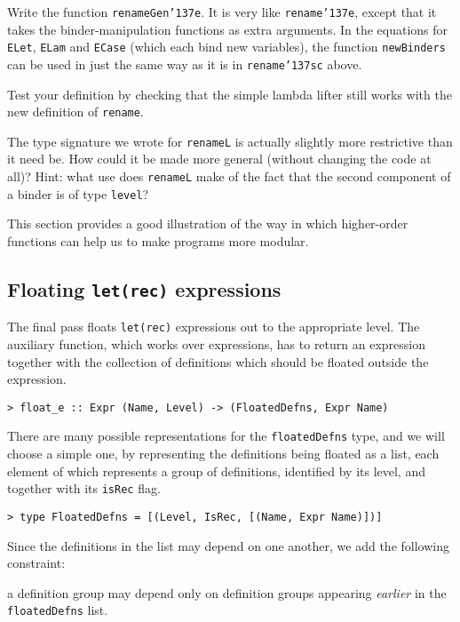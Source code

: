 \begin{exercise}
Write the function \mbox{\tt renameGen{\char'137}e}.  It is very like \mbox{\tt rename{\char'137}e}, except that
it takes the binder-manipulation functions as extra arguments.
In the equations for \mbox{\tt ELet}, \mbox{\tt ELam} and \mbox{\tt ECase} (which each bind
new variables), the function \mbox{\tt newBinders} can be used in just the same way
as it is in \mbox{\tt rename{\char'137}sc} above.

Test your definition by checking that the simple lambda lifter still works with
the new definition of \mbox{\tt rename}.
\end{exercise}

\begin{exercise}
The type signature we wrote for \mbox{\tt renameL} is actually slightly more restrictive
than it need be.  How could it be made more general (without changing the code
at all)?
Hint: what use does \mbox{\tt renameL} make of the fact that the second component
of a binder is of type \mbox{\tt level}?
\end{exercise}

This section provides a good illustration of the way in which
higher-order functions can help us to make programs more modular.

\subsection{Floating \mbox{\tt let(rec)} expressions}
\label{float}

The final pass floats \mbox{\tt let(rec)} expressions out to the appropriate
level.
The auxiliary function, which works over expressions,
has to return an expression together with the
collection of definitions which should be floated outside the expression.
\begin{verbatim}
> float_e :: Expr (Name, Level) -> (FloatedDefns, Expr Name)
\end{verbatim}
\par
There are many possible representations for the \mbox{\tt floatedDefns} type,
and we will choose a simple one, by representing the definitions being
floated as a list, each element of which represents a group of
definitions, identified by its level, and together with its \mbox{\tt isRec}
flag.
\begin{verbatim}
> type FloatedDefns = [(Level, IsRec, [(Name, Expr Name)])]
\end{verbatim}
%
Since the definitions in the list may depend on one another, we add
the following constraint:
\begin{important}
a definition group may depend only on
definition groups appearing {\em earlier\/} in the \mbox{\tt floatedDefns} list.
\end{important}

